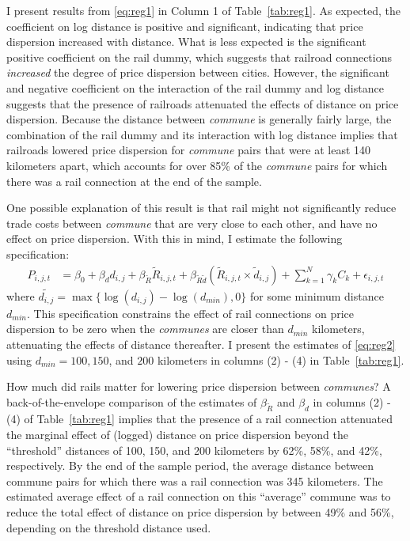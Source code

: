 \documentclass[12pt,twoside]{article}
\begin{document}
I present results from \eqref{eq:reg1} in Column 1 of Table~\ref{tab:reg1}.
As expected, the coefficient on log distance is positive and significant, indicating that price dispersion increased with distance.
What is less expected is the significant positive coefficient on the rail dummy, which suggests that railroad connections \emph{increased} the degree of price dispersion between cities.
However, the significant and negative coefficient on the interaction of the rail dummy and log distance suggests that the presence of railroads attenuated the effects of distance on price dispersion.
Because the distance between \emph{commune} is generally fairly large, the combination of the rail dummy and its interaction with log distance implies that railroads lowered price dispersion for \emph{commune} pairs that were at least 140 kilometers apart, which accounts for over 85\% of the \emph{commune} pairs for which there was a rail connection at the end of the sample.

One possible explanation of this result is that rail might not significantly reduce trade costs between \emph{commune} that are very close to each other, and have no effect on price dispersion.
With this in mind, I estimate the following specification:
\begin{align}
	P_{i,j,t} &= \beta_0 + \beta_d d_{i,j} + \beta_{\tilde{R}} \tilde{R}_{i,j,t} + \beta_{\tilde{R}\tilde{d}} (\tilde{R}_{i,j,t} \times \tilde{d}_{i,j}) + \sum_{k=1}^{N} \gamma_k C_k + \epsilon_{i,j,t} \label{eq:reg2}
\end{align}
where $\tilde{d_{i,j}} = \max\{ \log( d_{i,j} ) - \log( d_{min} ), 0 \}$ for some minimum distance $d_{min}$.
This specification constrains the effect of rail connections on price dispersion to be zero when the \emph{communes} are closer than $d_{min}$ kilometers, attenuating the effects of distance thereafter.
I present the estimates of \eqref{eq:reg2} using $d_{min} = 100, 150$, and $200$ kilometers in columns (2) - (4) in Table~\ref{tab:reg1}.

How much did rails matter for lowering price dispersion between \emph{communes}?
A back-of-the-envelope comparison of the estimates of $\beta_{\tilde{R}}$ and $\beta_d$ in columns (2) - (4) of Table~\ref{tab:reg1} implies that the presence of a rail connection attenuated the marginal effect of (logged) distance on price dispersion beyond the ``threshold'' distances of 100, 150, and 200 kilometers by 62\%, 58\%, and 42\%, respectively.
By the end of the sample period, the average distance between commune pairs for which there was a rail connection was 345 kilometers.
The estimated average effect of a rail connection on this ``average'' commune was to reduce the total effect of distance on price dispersion by between 49\% and 56\%, depending on the threshold distance used.
\end{document}
